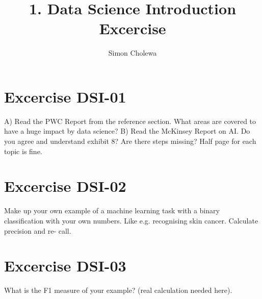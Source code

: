 \documentclass[11pt,a4paper]{article}
\title{}
\author{}
\begin{document}
\author{Simon Cholewa}
\title{1. Data Science Introduction Excercise}

\maketitle

\section{Excercise DSI-01}
A) Read the PWC Report from the reference section.
What areas are covered to have a huge impact by data science?
B) Read the McKinsey Report on AI.
Do you agree and understand exhibit 8? Are there steps missing?
Half page for each topic is fine.

\section{Excercise DSI-02}
Make up your own example of a machine learning task with a binary classification
with your own numbers. Like e.g. recognising skin cancer. Calculate precision and re-
call.

\section{Excercise DSI-03}
What is the F1 measure of your example? (real calculation needed here).
\end{document}
